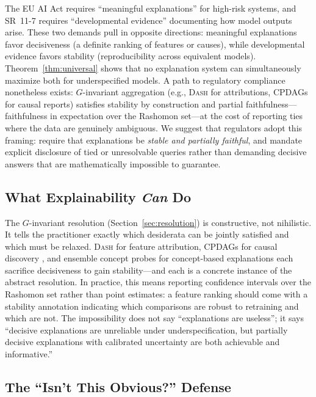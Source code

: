 \documentclass[11pt,a4paper]{article}
\newcommand{\DASH}{\textsc{Dash}}
\begin{document}
The EU AI Act \citep{euaiact2024} requires ``meaningful explanations'' for
high-risk systems, and SR~11-7 \citep{occ2011sr117} requires ``developmental
evidence'' documenting how model outputs arise.  These two demands pull in
opposite directions: meaningful explanations favor decisiveness (a definite
ranking of features or causes), while developmental evidence favors stability
(reproducibility across equivalent models).  Theorem~\ref{thm:universal} shows
that no explanation system can simultaneously maximize both for underspecified
models.  A path to regulatory compliance nonetheless exists: $G$-invariant
aggregation (e.g., \DASH{} for attributions, CPDAGs for causal reports)
satisfies stability by construction and partial faithfulness---faithfulness in
expectation over the Rashomon set---at the cost of reporting ties where the
data are genuinely ambiguous.  We suggest that regulators adopt this framing:
require that explanations be \emph{stable and partially faithful}, and mandate
explicit disclosure of tied or unresolvable queries rather than demanding
decisive answers that are mathematically impossible to guarantee.

\subsection[What Explainability Can Do]{What Explainability \emph{Can} Do}
\label{sec:can-do}

The $G$-invariant resolution (Section~\ref{sec:resolution}) is constructive, not
nihilistic.  It tells the practitioner exactly which desiderata can be jointly
satisfied and which must be relaxed.  \DASH{} for feature attribution, CPDAGs
for causal discovery \citep{verma1991equivalence}, and ensemble concept probes
for concept-based explanations \citep{kim2018tcav} each sacrifice decisiveness
to gain stability---and each is a concrete instance of the abstract resolution.
In practice, this means reporting confidence intervals over the Rashomon set
\citep{fisher2019models,semenova2022existence} rather than point estimates:
a feature ranking should come with a stability annotation indicating which
comparisons are robust to retraining and which are not.  The impossibility does
not say ``explanations are useless''; it says ``decisive explanations are
unreliable under underspecification, but partially decisive explanations with
calibrated uncertainty are both achievable and informative.''

\subsection[The Isn't This Obvious Defense]{The ``Isn't This Obvious?'' Defense}
\label{sec:obvious}
\end{document}
